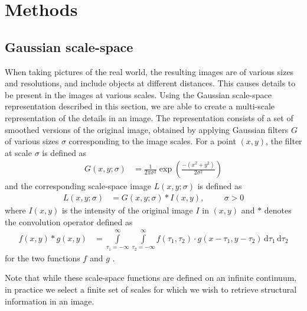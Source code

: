 \documentclass[thesis.tex]{subfiles}
\begin{document}
\chapter{Methods}

\section{Gaussian scale-space}
\label{sec:GaussianScaleSpace}
%
When taking pictures of the real world, the resulting images are of various sizes and resolutions, and include objects at different distances. This causes details to be present in the images at various scales. Using the Gaussian scale-space representation \cite{griffin1997scale,ginneken2000applications} described in this section, we are able to create a multi-scale representation of the details in an image. The representation consists of a set of smoothed versions of the original image, obtained by applying Gaussian filters $G$ of various sizes $\sigma$ corresponding to the image scales. For a point $(x,y)$, the filter at scale $\sigma$ is defined as
%
\begin{align}
	G(x,y;\sigma) &= \frac{1}{2\pi \sigma^2} \exp \left(\frac{-(x^2+y^2)}{2\sigma^2} \right)
\end{align}
%
and the corresponding scale-space image $L(x,y;\sigma)$ is defined as
%
\begin{align}
	L(x,y;\sigma) &= G(x,y;\sigma) \ast I(x,y),\hspace{1cm}\sigma > 0
\end{align}
%
where $I(x,y)$ is the intensity of the original image $I$ in $(x,y)$ and $\ast$ denotes the convolution operator defined as
\begin{align*}
	f(x,y) \ast g(x,y) &= \int\limits_{\tau_1 = -\infty}^\infty \int\limits_{\tau_2 = -\infty}^\infty f(\tau_1,\tau_2) \cdot g(x-\tau_1,y-\tau_2)\,\text{d}\tau_1\,\text{d}\tau_2
\end{align*}
for the two functions $f$ and $g$ \cite[p.~345]{gonzalez:2008:digital}.

Note that while these scale-space functions are defined on an infinite continuum, in practice we select a finite set of scales for which we wish to retrieve structural information in an image.
\end{document}
